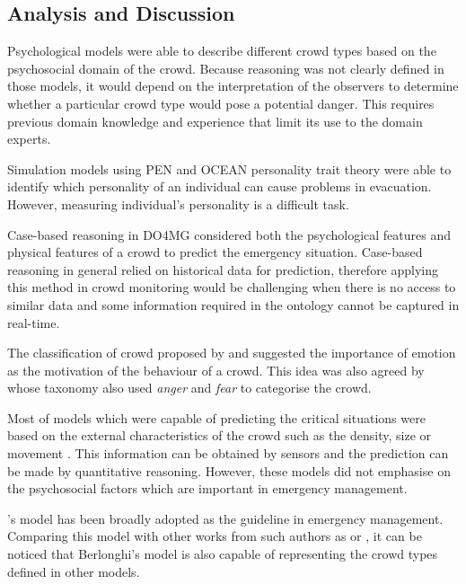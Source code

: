 \subsection{Analysis and Discussion}

Psychological models \parencite{Blumer1951,Lofland1985,Momboisse1967} were able to describe different crowd types based on the psychosocial domain of the crowd. Because reasoning was not clearly defined in those models, it would depend on the interpretation of the observers to determine whether a particular crowd type would pose a potential danger. This requires previous domain knowledge and experience that limit its use to the domain experts.

Simulation models using PEN \parencite{Guy2011} and OCEAN \parencite{Durupinar2008} personality trait theory were able to identify which personality of an individual can cause problems in evacuation. However, measuring individual’s personality is a difficult task.

Case-based reasoning in DO4MG \parencite{DelirHaghighi2013a} considered both the psychological features and physical features of a crowd to predict the emergency situation. Case-based reasoning in general relied on historical data for prediction, therefore applying this method in crowd monitoring would be challenging when there is no access to similar data and some information required in the ontology cannot be captured in real-time.

The classification of crowd proposed by \textcite{Lofland1985} and \textcite{Smelser1998} suggested the importance of emotion as the motivation of the behaviour of a crowd. This idea was also agreed by \textcite{Brown1954} whose taxonomy also used \textit{anger} and \textit{fear} to categorise the crowd.

Most of models which were capable of predicting the critical situations were based on the external characteristics of the crowd such as the density, size or movement \parencite{Helbing2007,Lee2005}. This information can be obtained by sensors and the prediction can be made by quantitative reasoning. However, these models did not emphasise on the psychosocial factors which are important in emergency management.

\textcite{Berlonghi1995}’s model has been broadly adopted as the guideline in emergency management. Comparing this model with other works from such authors as \textcite{Blumer1951} or \textcite{Momboisse1967}, it can be noticed that Berlonghi's model is also capable of representing the crowd types defined in other models. 

